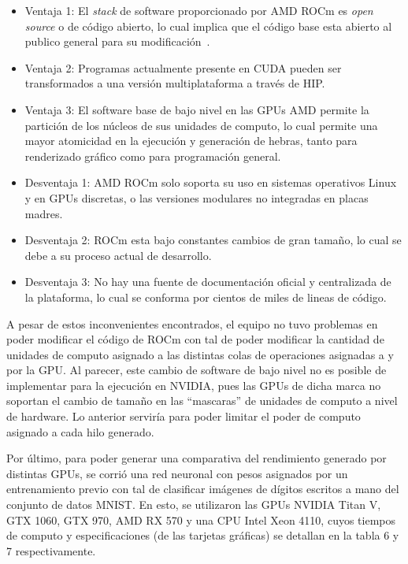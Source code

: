 \begin{itemize}
    \item Ventaja 1: El \textit{stack} de software proporcionado por AMD ROCm es \textit{open source} o de código abierto, lo cual implica que el código base esta abierto al publico general para su modificación~\cite{openS}.
    \item Ventaja 2: Programas actualmente presente en CUDA pueden ser transformados a una versión multiplataforma a través de HIP.
    \item Ventaja 3: El software base de bajo nivel en las GPUs AMD permite la partición de los núcleos de sus unidades de computo, lo cual permite una mayor atomicidad en la ejecución y generación de hebras, tanto para renderizado gráfico como para programación general.
    \item Desventaja 1: AMD ROCm solo soporta su uso en sistemas operativos Linux y en GPUs discretas, o las versiones modulares no integradas en placas madres.
    \item Desventaja 2: ROCm esta bajo constantes cambios de gran tamaño, lo cual se debe a su proceso actual de desarrollo.
    \item Desventaja 3: No hay una fuente de documentación oficial y centralizada de la plataforma, lo cual se conforma por cientos de miles de lineas de código.
\end{itemize}

A pesar de estos inconvenientes encontrados, el equipo no tuvo problemas en poder modificar el código de ROCm con tal de poder modificar la cantidad de unidades de computo asignado a las distintas colas de operaciones asignadas a y por la GPU.
Al parecer, este cambio de software de bajo nivel no es posible de implementar para la ejecución en NVIDIA, pues las GPUs de dicha marca no soportan el cambio de tamaño en las ``mascaras'' de unidades de computo a nivel de hardware.
Lo anterior serviría para poder limitar el poder de computo asignado a cada hilo generado.

Por último, para poder generar una comparativa del rendimiento generado por distintas GPUs, se corrió una red neuronal con pesos asignados por un entrenamiento previo con tal de clasificar imágenes de dígitos escritos a mano del conjunto de datos MNIST.
En esto, se utilizaron las GPUs NVIDIA Titan V, GTX 1060, GTX 970, AMD RX 570 y una CPU Intel Xeon 4110, cuyos tiempos de computo y especificaciones (de las tarjetas gráficas) se detallan en la tabla 6 y 7 respectivamente.

